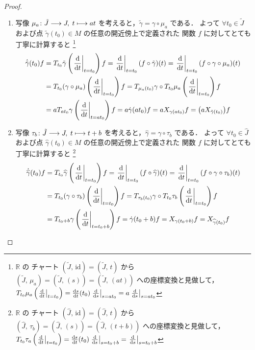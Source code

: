 \documentclass[TQFT_main]{subfiles}
\begin{document}
\begin{proof}
    \begin{enumerate}
        \item \cinfty 写像 $\mu_a \colon \tilde{J} \longrightarrow J,\; t \longmapsto at$ を考えると，$\tilde{\gamma} = \gamma \circ \mu_a$ である．
        よって $\forall t_0 \in \tilde{J}$ および点 $\tilde{\gamma}(t_0) \in M$ の任意の開近傍上で定義された \cinfty 関数 $f$ に対してとても丁寧に計算すると
        \footnote{
            $\mathbb{R}$ の チャート $(\tilde{J},\, \mathrm{id}) = (\tilde{J},\, t)$ から $(\tilde{J},\, \mu_a) = (\tilde{J},\, (s)) = (\tilde{J},\, (at))$ への座標変換と見做して，$T_{t_0} \mu_a \left( \eval{\dv{}{t}}_{t=t_0} \right) = \dv{s}{t}()(t_0) \eval{\dv{}{s}}_{s=at_0} = a \eval{\dv{}{s}}_{s=at_0}$
        }
        \begin{align}
            \dot{\tilde{\gamma}}(t_0) f
            &= T_{t_0} \tilde{\gamma} \left( \eval{\dv{{t}}}_{t=t_0} \right) f
            = \eval{\dv{{t}}}_{t=t_0} (f \circ \tilde{\gamma})(t)
            = \eval{\dv{{t}}}_{t=t_0} (f \circ \gamma \circ \mu_a)(t) \\
            &= T_{t_0} (\gamma \circ \mu_a) \left( \eval{\dv{{t}}}_{t=t_0} \right) f
            = T_{\mu_a(t_0)} \gamma \circ T_{t_0} \mu_a \left( \eval{\dv{}{t}}_{t=t_0} \right) f \\
            &= aT_{at_0} \gamma  \left( \eval{\dv{}{t}}_{t=at_0} \right) f
            = a \dot{\gamma}(at_0) f
            = a X_{\gamma(at_0)} f
            = \bigl(a X_{\tilde{\gamma}(t_0)}\bigr) f
        \end{align}
        \item \cinfty 写像 $\tau_b \colon \tilde{J} \longrightarrow J,\; t \longmapsto t+b$ を考えると，$\widehat{\gamma} = \gamma \circ \tau_b$ である．
        よって $\forall t_0 \in \widehat{J}$ および点 $\widehat{\gamma}(t_0) \in M$ の任意の開近傍上で定義された \cinfty 関数 $f$ に対してとても丁寧に計算すると
        \footnote{
            $\mathbb{R}$ の チャート $(\widehat{J},\, \mathrm{id}) = (\widehat{J},\, t)$ から $(\widehat{J},\, \tau_b) = (\widehat{J},\, (s)) = (\widehat{J},\, (t+b))$ への座標変換と見做して，$T_{t_0} \tau_a \left( \eval{\dv{}{t}}_{t=t_0} \right) = \dv{s}{t}()(t_0) \eval{\dv{}{s}}_{s=t_0 + b} = \eval{\dv{}{s}}_{s=t_0+b}$
        }
        \begin{align}
            \dot{\widehat{\gamma}}(t_0) f
            &= T_{t_0} \widehat{\gamma} \left( \eval{\dv{{t}}}_{t=t_0} \right) f
            = \eval{\dv{{t}}}_{t=t_0} (f \circ \widehat{\gamma})(t)
            = \eval{\dv{{t}}}_{t=t_0} (f \circ \gamma \circ \tau_b)(t) \\
            &= T_{t_0} (\gamma \circ \tau_b) \left( \eval{\dv{{t}}}_{t=t_0} \right) f
            = T_{\tau_b(t_0)} \gamma \circ T_{t_0} \tau_b \left( \eval{\dv{}{t}}_{t=t_0} \right) f\\
            &= T_{t_0 + b} \gamma  \left( \eval{\dv{}{t}}_{t=t_0 + b} \right) f
            = \dot{\gamma}(t_0 + b) f
            = X_{\gamma(t_0 + b)} f 
            = X_{\widehat{\gamma}(t_0)} f
        \end{align}
    \end{enumerate}
    
\end{proof}
\end{document}
